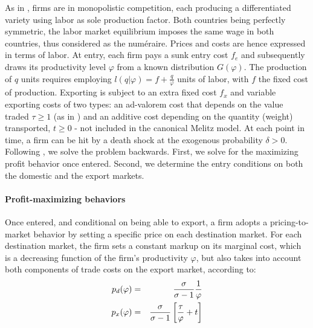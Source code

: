 \documentclass[a4paper,11pt]{article}
\begin{document}
As in \cite{melitz}, firms are in monopolistic competition, each producing a differentiated variety using labor as sole production factor. Both countries being perfectly symmetric, the labor market equilibrium imposes the same wage in both countries, thus considered as the num\'{e}raire. Prices and costs are hence expressed in terms of labor. At entry, each firm pays a sunk entry cost $f_e$ and subsequently draws its productivity level $\varphi$ from a known distribution $G(\varphi)$. The production of $q$ units requires employing $l(q|\varphi) = f+\frac{q}{\varphi}$ units of labor, with $f$ the fixed cost of production. Exporting is subject to an extra fixed cost $f_x$ and variable exporting costs of two types: an ad-valorem cost that depends on the value traded $\tau\geq 1$ (as in \citealp{melitz}) and an additive cost depending on the quantity (weight) transported, $t\geq 0$ - not included in the canonical Melitz model. At each point in time, a firm can be hit by a death shock at the exogenous probability $\delta>0$. Following \cite{melitz}, we solve the problem backwards. First, we solve for the maximizing profit behavior once entered. Second, we determine the entry conditions on both the domestic and the export markets.\medskip

\paragraph{Profit-maximizing behaviors} Once entered, and conditional on being able to export, a firm adopts a pricing-to-market behavior by setting a specific price on each destination market. For each destination market, the firm sets a constant markup on its marginal cost, which is a decreasing function of the firm's productivity $\varphi$, but also takes into account both components of trade costs on the export market, according to:
\begin{eqnarray}
p_d(\varphi) &=& \frac{\sigma}{\sigma-1}\frac{1}{\varphi} \notag \\
p_x(\varphi) &=& \frac{\sigma}{\sigma-1}\left[\frac{\tau}{\varphi} +t \right] \label{eq:px}
\end{eqnarray}
\end{document}
